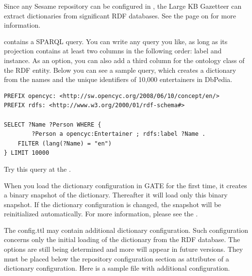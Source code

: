 Since any Sesame repository can be configured in , the Large
KB Gazetteer can extract dictionaries from  significant RDF databases.
See the page on
 for more information.

 contains a SPARQL query. You can write any query you like,
as long as its projection contains at least two columns in the following
order: label and instance. As an option, you can also add a third column for
the ontology class of the RDF entity. Below you can see a sample query, which
creates a dictionary from the names and the unique identifiers of 10,000
entertainers in DbPedia.

\begin{pverbatimbox}
\begin{small}\begin{verbatim}
PREFIX opencyc: <http://sw.opencyc.org/2008/06/10/concept/en/>
PREFIX rdfs: <http://www.w3.org/2000/01/rdf-schema#>

SELECT ?Name ?Person WHERE {
        ?Person a opencyc:Entertainer ; rdfs:label ?Name .           
    FILTER (lang(?Name) = "en") 
} LIMIT 10000
\end{verbatim}\end{small}
\end{pverbatimbox}

Try this query at the .

When you load the dictionary configuration in GATE for the first time, it
creates a binary snapshot of the dictionary. Thereafter it will load only this
binary snapshot. If the dictionary configuration is changed, the snapshot will
be reinitialized automatically. For more information, please see the
.


The config.ttl may contain additional dictionary configuration. Such
configuration concerns only the initial loading of the dictionary from the RDF
database. The options are still being determined and more will appear in
future versions. They must be placed below the repository configuration
section as attributes of a dictionary configuration. Here is a sample
 file with additional configuration.

